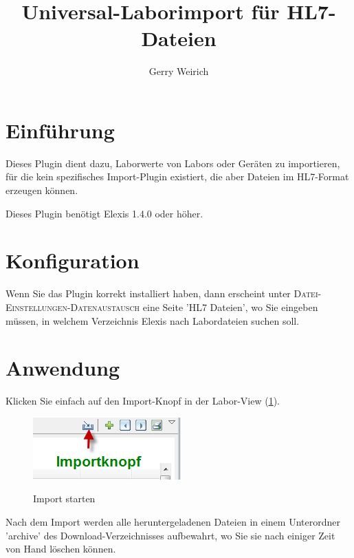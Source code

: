 \documentclass[a4paper]{scrartcl}
\begin{document}
\title{Universal-Laborimport für HL7-Dateien}
\author{Gerry Weirich}
\maketitle
\section{Einführung}
Dieses Plugin dient dazu, Laborwerte von Labors oder Geräten zu importieren, für die kein spezifisches Import-Plugin existiert, die aber Dateien im HL7-Format erzeugen können.

\medskip

Dieses Plugin benötigt Elexis 1.4.0 oder höher.

\section{Konfiguration}

Wenn Sie das Plugin korrekt installiert haben, dann erscheint unter \textsc{Datei-Einstellungen-Datenaustausch} eine Seite 'HL7 Dateien', wo Sie eingeben müssen, in welchem Verzeichnis Elexis nach Labordateien suchen soll.

\section{Anwendung}
Klicken Sie einfach auf den Import-Knopf in der Labor-View (\ref{fig:lab1}).

\begin{figure}
  \includegraphics{abb1.png}\\
  \caption{Import starten}\label{fig:lab1}
\end{figure}


Nach dem Import werden alle heruntergeladenen Dateien in einem Unterordner 'archive' des Download-Verzeichnisses aufbewahrt, wo Sie sie nach einiger Zeit von Hand löschen können.
\end{document}
